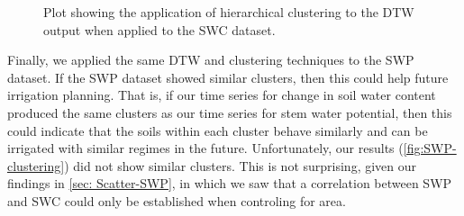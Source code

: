 \documentclass[12pt]{scrartcl}
\begin{document}
\begin{figure}[!htb]
        \caption{\label{fig:DTW-clustering} Plot showing the application of hierarchical clustering to the DTW output when applied to the SWC dataset.}
\end{figure}

Finally, we applied the same DTW and clustering techniques to the SWP dataset. If the SWP dataset showed similar clusters, then this could help future irrigation planning. That is, if our time series for change in soil water content produced the same clusters as our time series for stem water potential, then this could indicate that the soils within each cluster behave similarly and can be irrigated with similar regimes in the future. Unfortunately, our results (\autoref{fig:SWP-clustering}) did not show similar clusters. This is not surprising, given our findings in \autoref{sec: Scatter-SWP}, in which we saw that a correlation between SWP and SWC could only be established when controling for area.
\end{document}
